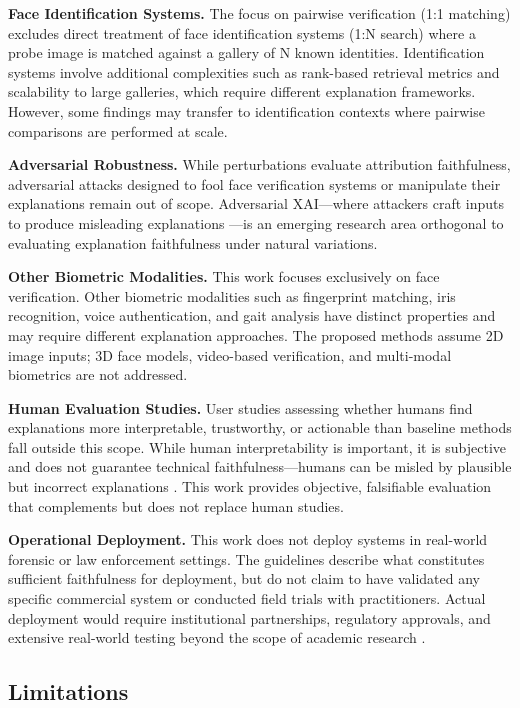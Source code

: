 \textbf{Face Identification Systems.} The focus on pairwise verification (1:1 matching) excludes direct treatment of face identification systems (1:N search) where a probe image is matched against a gallery of N known identities. Identification systems involve additional complexities such as rank-based retrieval metrics and scalability to large galleries, which require different explanation frameworks. However, some findings may transfer to identification contexts where pairwise comparisons are performed at scale.

\textbf{Adversarial Robustness.} While perturbations evaluate attribution faithfulness, adversarial attacks designed to fool face verification systems or manipulate their explanations remain out of scope. Adversarial XAI---where attackers craft inputs to produce misleading explanations \cite{slack2020fooling,dombrowski2019explanations}---is an emerging research area orthogonal to evaluating explanation faithfulness under natural variations.

\textbf{Other Biometric Modalities.} This work focuses exclusively on face verification. Other biometric modalities such as fingerprint matching, iris recognition, voice authentication, and gait analysis have distinct properties and may require different explanation approaches. The proposed methods assume 2D image inputs; 3D face models, video-based verification, and multi-modal biometrics are not addressed.

\textbf{Human Evaluation Studies.} User studies assessing whether humans find explanations more interpretable, trustworthy, or actionable than baseline methods fall outside this scope. While human interpretability is important, it is subjective and does not guarantee technical faithfulness---humans can be misled by plausible but incorrect explanations \cite{lage2019human,poursabzisangdeh2021manipulating}. This work provides objective, falsifiable evaluation that complements but does not replace human studies.

\textbf{Operational Deployment.} This work does not deploy systems in real-world forensic or law enforcement settings. The guidelines describe what constitutes sufficient faithfulness for deployment, but do not claim to have validated any specific commercial system or conducted field trials with practitioners. Actual deployment would require institutional partnerships, regulatory approvals, and extensive real-world testing beyond the scope of academic research \cite{raji2020closing}.

\subsection{Limitations}

